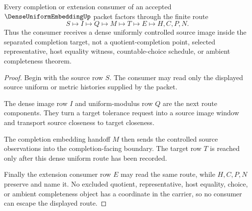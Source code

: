 \begin{theorem}
\label{thm:dense-uniform-embedding-completion-consumer-route}
Every completion or extension consumer of an accepted $\DenseUniformEmbeddingUp$ packet factors through the finite route
$$
S\longmapsto I\longmapsto Q\longmapsto M\longmapsto T\longmapsto E\longmapsto H,C,P,N .
$$
Thus the consumer receives a dense uniformly controlled source image inside the separated completion target, not a quotient-completion point, selected representative, host equality witness, countable-choice schedule, or ambient completeness theorem.
\end{theorem}
\begin{proof}
Begin with the source row $S$. The consumer may read only the displayed source uniform or metric histories supplied by the packet.

The dense image row $I$ and uniform-modulus row $Q$ are the next route components. They turn a target tolerance request into a source image window and transport source closeness to target closeness.

The completion embedding handoff $M$ then sends the controlled source observations into the completion-facing boundary. The target row $T$ is reached only after this dense uniform route has been recorded.

Finally the extension consumer row $E$ may read the same route, while $H,C,P,N$ preserve and name it. No excluded quotient, representative, host equality, choice, or ambient completeness object has a coordinate in the carrier, so no consumer can escape the displayed route.
\end{proof}

